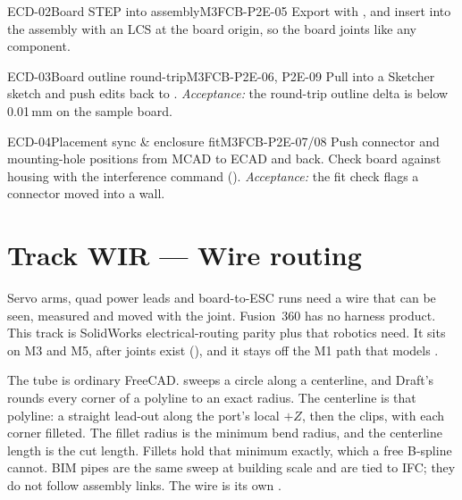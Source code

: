 \begin{epic}{ECD-02}{Board STEP into assembly}{M3}{\stTodo}{FCB-P2E-05}
Export with , and insert into the assembly with an LCS at the board origin, so
the board joints like any component.
\end{epic}

\begin{epic}{ECD-03}{Board outline round-trip}{M3}{\stTodo}{FCB-P2E-06, P2E-09}
Pull  into a Sketcher sketch and push edits back to .
\emph{Acceptance:} the round-trip outline delta is below 0.01\,mm on the sample board.
\end{epic}

\begin{epic}{ECD-04}{Placement sync \& enclosure fit}{M3}{\stTodo}{FCB-P2E-07/08}
Push connector and mounting-hole positions from MCAD to ECAD and back. Check board against housing with the
interference command ().
\emph{Acceptance:} the fit check flags a connector moved into a wall.
\end{epic}

\section{Track WIR --- Wire routing}\label{sec:wir}

Servo arms, quad power leads and board-to-ESC runs need a wire that can be seen, measured and moved with
the joint. Fusion~360 has no harness product. This track is SolidWorks electrical-routing parity plus that
robotics need. It sits on M3 and M5, after joints exist (), and it stays off the M1 path that
models .

The tube is ordinary FreeCAD.  sweeps a circle along a centerline, and
Draft's  rounds every corner of a polyline to an exact radius. The centerline is that
polyline: a straight lead-out along the port's local $+Z$, then the clips, with each corner filleted.
The fillet radius is the minimum bend radius, and the centerline length is the cut length. Fillets hold
that minimum exactly, which a free B-spline cannot. BIM pipes are the same sweep at building scale and are
tied to IFC; they do not follow assembly links. The wire is its own .

